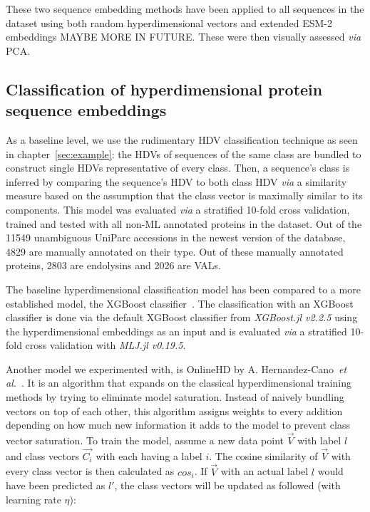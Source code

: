 These two sequence embedding methods have been applied to all sequences in the dataset using both random hyperdimensional vectors and extended ESM-2 embeddings MAYBE MORE IN FUTURE. These were then visually assessed \textit{via} PCA.

\subsection*{Classification of hyperdimensional protein sequence embeddings}
As a baseline level, we use the rudimentary HDV classification technique as seen in chapter~\ref{sec:example}: the HDVs of sequences of the same class are bundled to construct single HDVs representative of every class. Then, a sequence's class is inferred by comparing the sequence's HDV to both class HDV \textit{via} a similarity measure based on the assumption that the class vector is maximally similar to its components. This model was evaluated \textit{via} a stratified 10-fold cross validation, trained and tested with all non-ML annotated proteins in the dataset. Out of the 11549 unambiguous UniParc accessions in the newest version of the database, 4829 are manually annotated on their type. Out of these manually annotated proteins, 2803 are endolysins and 2026 are VALs.

The baseline hyperdimensional classification model has been compared to a more established model, the XGBoost classifier~\cite{xgboost}. The classification with an XGBoost classifier is done via the default XGBoost classifier from \textit{XGBoost.jl v2.2.5} using the hyperdimensional embeddings as an input and is evaluated \textit{via} a stratified 10-fold cross validation with \textit{MLJ.jl v0.19.5}.

Another model we experimented with, is OnlineHD by A. Hernandez-Cano~\textit{et al.}~\cite{onlinehd}. It is an algorithm that expands on the classical hyperdimensional training methods by trying to eliminate model saturation. Instead of naively bundling vectors on top of each other, this algorithm assigns weights to every addition depending on how much new information it adds to the model to prevent class vector saturation. To train the model, assume a new data point $\vec{V}$ with label $l$ and class vectors $\vec{C_{i}}$ with each having a label $i$. The cosine similarity of $\vec{V}$ with every class vector is then calculated as $cos_{i}$. If $\vec{V}$ with an actual label $l$ would have been predicted as $l'$, the class vectors will be updated as followed (with learning rate $\eta$):

